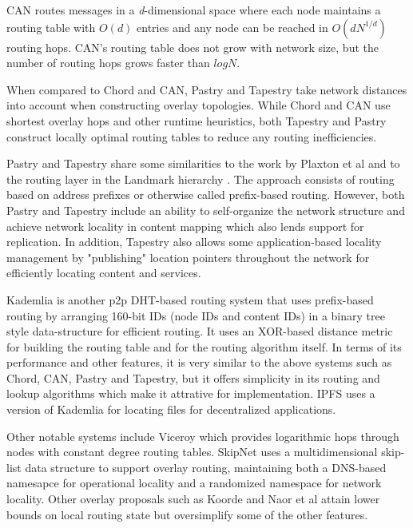 CAN routes messages in a {\em d}-dimensional space where each node maintains a routing table with \(O(d)\) entries and
any node can be reached in \(O(dN^{1/d})\) routing hops. CAN's routing table does not grow with network size, but the
number of routing hops grows faster than \(log N\).

When compared to Chord and CAN, Pastry and Tapestry take network distances into account when constructing overlay
topologies. While Chord and CAN use shortest overlay hops and other runtime heuristics, both Tapestry and Pastry
construct locally optimal routing tables to reduce any routing inefficiencies. 

Pastry and Tapestry share some similarities to the work by Plaxton et al \cite{Plaxton_1997} and to the routing layer in
the Landmark hierarchy \cite{Tsuchiya_1988}. The approach consists of routing based on address prefixes or otherwise
called prefix-based routing. However, both Pastry and Tapestry include an ability to self-organize the network structure
and achieve network locality in content mapping which also lends support for replication.
In addition, Tapestry also allows some application-based locality management by "publishing" location pointers
throughout the network for efficiently locating content and services.

Kademlia \cite{kademlia} is another p2p DHT-based routing system that uses prefix-based routing by arranging 160-bit IDs
(node IDs and content IDs) in a binary tree style data-structure for efficient routing. It uses an XOR-based distance
metric for building the routing table and for the routing algorithm itself. In terms of its performance and other
features, it is very similar to the above systems such as Chord, CAN, Pastry and Tapestry, but it offers simplicity in
its routing and lookup algorithms which make it attrative for implementation. IPFS \cite{ipfs} uses a version of
Kademlia for locating files for decentralized applications.

Other notable systems include Viceroy \cite{viceroy} which provides logarithmic hops through nodes with constant degree
routing tables. SkipNet \cite{skipnet} uses a multidimensional skip-list data structure to support overlay routing,
maintaining both a DNS-based namesapce for operational locality and a randomized namespace for network locality. Other
overlay proposals such as Koorde \cite{koorde} and Naor et al \cite{simple_hash} attain lower bounds on local routing
state but oversimplify some of the other features. 


